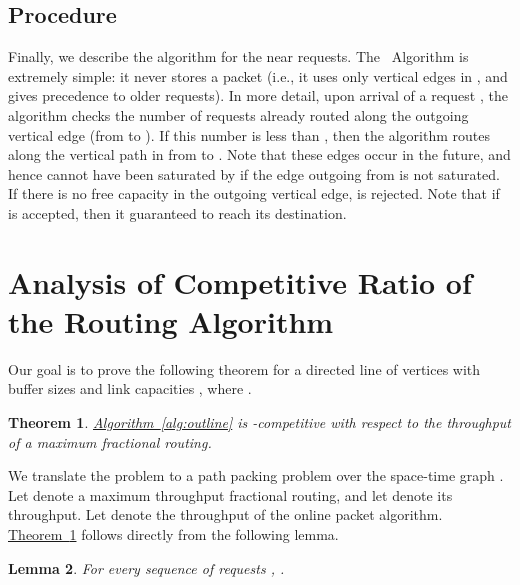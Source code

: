 \documentclass[11pt]{article}
\newtheorem{theorem}{Theorem}
\newtheorem{lemma}[theorem]{Lemma}
\newcommand{\namedref}[2]{\hyperref[#2]{#1~\ref*{#2}}}
\newcommand{\theoremref}[1]{\namedref{Theorem}{#1}}
\newcommand{\Algref}[1]{\namedref{Algorithm}{#1}}
\newcommand{\routenear}{\text{\sc{route-near}}\xspace}
\newenvironment{proof sketch}[1]{\noindent {\emph{Proof sketch of #1:}}}{\hfill \qed}
\begin{document}
\subsection{Procedure \routenear}\label{sec:near}


Finally, we describe the algorithm for the near requests.  The
\routenear\ Algorithm is extremely simple: it never stores a packet
(i.e., it uses only vertical edges in , and gives precedence
to older requests). In more detail, upon arrival of a request , the algorithm checks the number of requests already routed
along the outgoing vertical edge (from  to ). If
this number is less than , then the algorithm routes  along
the vertical path in  from  to
. Note that these edges occur in the future, and
hence cannot have been saturated by \routenear if the edge outgoing
from  is not saturated.  If there is no free capacity in the
outgoing vertical edge,  is rejected. Note that if  is
accepted, then it guaranteed to reach its destination.


\section{Analysis of Competitive Ratio of the Routing Algorithm}
\label{sec:analysis}


Our goal is to prove the following theorem for a directed line  of  vertices with
buffer sizes  and link capacities , where .
\begin{theorem}\label{thm:main}
  \Algref{alg:outline} is -competitive with respect to the throughput of a
  maximum fractional routing.
\end{theorem}

We translate the problem to a path packing problem over the space-time graph .
Let  denote a maximum throughput fractional  routing, and let
 denote its throughput. Let  denote the throughput of the
online packet algorithm. \theoremref{thm:main} follows directly from the following
lemma.

\begin{lemma}\label{lemma:frac cr} For every sequence of requests ,
  .
\end{lemma}
\end{document}
